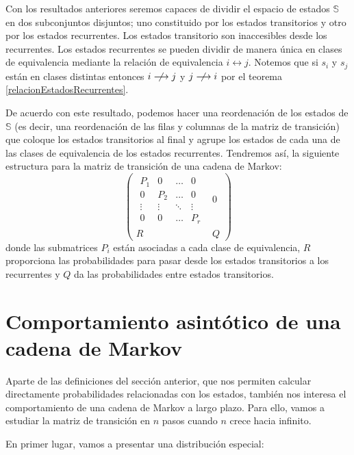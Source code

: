 Con los resultados anteriores seremos capaces de dividir el espacio de estados $\mathbb{S}$ en dos subconjuntos disjuntos; uno constituido por los estados transitorios y otro por los estados recurrentes. Los estados transitorio son inaccesibles desde los recurrentes. Los estados recurrentes se pueden dividir de manera única en clases de equivalencia mediante la relación de equivalencia $i\longleftrightarrow j$. Notemos que si $s_i$ y $s_j$ están en clases distintas entonces $i\centernot\longrightarrow j$ y $j\centernot\longrightarrow i$ por el teorema \ref{relacionEstadosRecurrentes}.

De acuerdo con este resultado, podemos hacer una reordenación de los estados de $\mathbb{S}$ (es decir, una reordenación de las filas y columnas de la matriz de transición) que coloque los estados transitorios al final y agrupe los estados de cada una de las clases de equivalencia de los estados recurrentes. Tendremos así, la siguiente estructura para la matriz de transición de una cadena de Markov:
\[
\left(
\begin{array}{c|c}
    
    \begin{matrix}
    P_1 & 0 & \dots & 0 \\
    0 & P_2 & \dots & 0 \\
    \vdots & \vdots & \ddots & \vdots \\
    0 & 0 & \dots & P_r
    \end{matrix} & 0 \\
    \hline
     R & Q 
\end{array}
\right)
\]
donde las submatrices $P_i$ están asociadas a cada clase de equivalencia, $R$ proporciona las probabilidades para pasar desde los estados transitorios a los recurrentes y $Q$ da las probabilidades entre estados transitorios.





\section{Comportamiento asintótico de una cadena de Markov}
Aparte de las definiciones del sección anterior, que nos permiten calcular directamente probabilidades relacionadas con los estados, también nos interesa el comportamiento de una cadena de Markov a largo plazo. Para ello, vamos a estudiar la matriz de transición en $n$ pasos cuando $n$ crece hacia infinito.

En primer lugar, vamos a presentar una distribución especial:

